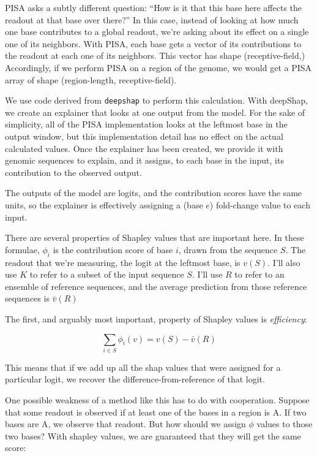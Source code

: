\documentclass{article}
\begin{document}
PISA asks a subtly different question:
``How is it that this base here affects the readout at that base over there?''
In this case, instead of looking at how much one base contributes to a global readout, we're
asking about its effect on a single one of its neighbors. With PISA, each base gets a vector of
its contributions to the readout at each one of its neighbors.
This vector has shape (receptive-field,)
Accordingly, if we perform PISA on a region of the genome, we would get a PISA array of shape
(region-length, receptive-field).

We use code derived from \texttt{deepshap} to perform this calculation. With deepShap, we create
an explainer that looks at one output from the model. For the sake of simplicity, all of the PISA
implementation looks at the leftmost base in the output window, but this implementation detail
has no effect on the actual calculated values.
Once the explainer has been created, we provide it with genomic sequences to explain, and it
assigns, to each base in the input, its contribution to the observed output.

The outputs of the model are logits, and the contribution scores have the same units, so the
explainer is effectively assigning a (base $e$) fold-change value to each input.

There are several properties of Shapley values that are important here.
In these formulae, $\phi_i$ is the contribution score of base $i$, drawn from the sequence $S$.
The readout that we're measuring, the logit at the leftmost base, is $v(S)$.
I'll also use $K$ to refer to a subset of the input sequence $S$.
I'll use $R$ to refer to an ensemble of reference sequences, and the average prediction from those
reference sequences is $\bar{v}(R)$

The first, and arguably most important, property of Shapley values is \emph{efficiency}:

\begin{equation}
    \sum_{i \in S} \phi_i(v) = v(S) - \bar{v}(R)
\end{equation}

This means that if we add up all the shap values that were assigned for a particular logit, we
recover the difference-from-reference of that logit.

One possible weakness of a method like this has to do with cooperation. Suppose that some readout
is observed if at least one of the bases in a region is A. If two bases are A, we observe that
readout. But how should we assign $\phi$ values to those two bases?
With shapley values, we are guaranteed that they will get the same score:
\end{document}

